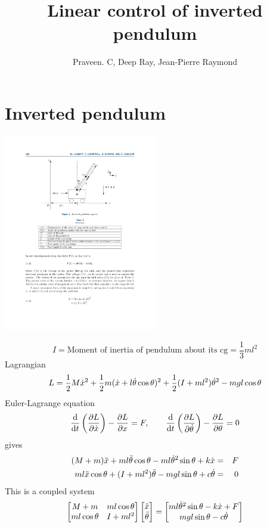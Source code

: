 \documentclass[12pt]{article}
\title{Linear control of inverted pendulum}
\author{Praveen. C, Deep Ray, Jean-Pierre Raymond}
\begin{document}
\maketitle


\section{Inverted pendulum}
\begin{center}
\includegraphics[width=0.50\textwidth]{inv_pendulum}
\end{center}
\[
I = \mbox{Moment of inertia of pendulum about its cg} = \frac{1}{3} m l^2
\]
Lagrangian
\[
L = \frac{1}{2} M \dot{x}^2 + \frac{1}{2}m(\dot{x} + l \dot{\theta} \cos\theta)^2 + \frac{1}{2}(I+ml^2)     \dot{\theta}^2 - mgl\cos\theta
\]
Euler-Lagrange equation
\[
\frac{\textrm{d} }{\textrm{d} t} \left(\frac{\partial L}{\partial \dot{x}}\right) - \frac{\partial L}{\partial x} = F, \qquad \frac{\textrm{d} }{\textrm{d} t} \left( \frac{\partial L}{\partial \dot{\theta}}      \right) - \frac{\partial L}{\partial \theta} = 0
\]
gives
\begin{eqnarray*}
(M+m) \ddot{x} + m l \ddot{\theta} \cos\theta - m l \dot{\theta}^2 \sin\theta + k \dot{x} &=&  F \\
m l \ddot{x} \cos\theta + (I+ml^2) \ddot{\theta} - mg l \sin\theta + c \dot{\theta} &=& 0
\end{eqnarray*}
This is a coupled system
\[
\begin{bmatrix}
M+m & m l \cos\theta \\
m l \cos\theta & I + ml^2 \end{bmatrix}
\begin{bmatrix}
\ddot{x} \\ \ddot{\theta} \end{bmatrix} = \begin{bmatrix}
m l \dot{\theta}^2 \sin\theta - k \dot{x} + F \\
mg l \sin\theta - c \dot{\theta} \end{bmatrix}
\]
\end{document}

